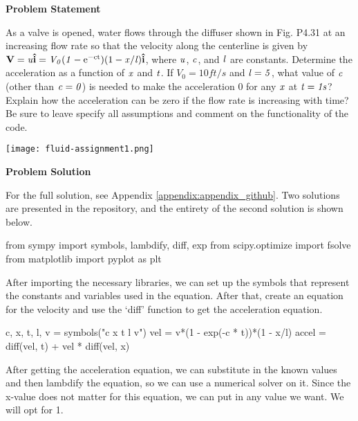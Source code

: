 \begin{tcolorbox}[breakable, enhanced jigsaw, title=ME 571: Assignment \ref{fluid_assignment_1}, 
    colframe=ksu-purple, colback=ksu-gray]

    \textbf{Problem Statement}
    \parindent15pt

    As a valve is opened, water flows through the diffuser shown in Fig. P4.31 at an increasing 
    flow rate so that the velocity along the centerline is given by 
    $ \mathbf{V} = \it{u}\mathbf{\hat{i}}  = V_0(1 - \rm{e}^{-ct})(1 - \it{x/l})\mathbf{\hat{i}} $, 
    where $\it{u}$, $ \it{c} $, and $ \it{l} $ are constants. Determine the acceleration as 
    a function of $ \it{x} $ and $ \it{t} $. If $ V_0 = 10 ft/s $ and $ \it{l} = 5 $, what value 
    of $ \it{c} $ (other than $ \it{c} = 0 $) is needed to make the acceleration 0 for any 
    $ \it{x} $ at $ \it{t} = 1s $? Explain how the acceleration can be zero if the flow rate 
    is increasing with time? Be sure to leave specify all assumptions and comment on the 
    functionality of the code.

    \begin{center}
        \texttt{[image: fluid-assignment1.png]} 
    \end{center}

    \tcblower
    \textbf{Problem Solution}
    \parindent15pt

    For the full solution, see Appendix \ref{appendix:appendix_github}. Two solutions are 
    presented in the repository, and the entirety of the second solution is shown below.

\begin{python}
from sympy import symbols, lambdify, diff, exp
from scipy.optimize import fsolve
from matplotlib import pyplot as plt
\end{python}

After importing the necessary libraries, we can set up the symbols that represent the 
constants and variables used in the equation. After that, create an equation for the 
velocity and use the `diff' function to get the acceleration equation.

\begin{python}
c, x, t, l, v = symbols("c x t l v")
vel = v*(1 - exp(-c * t))*(1 - x/l)
accel = diff(vel, t) + vel * diff(vel, x)
\end{python}

After getting the acceleration equation, we can substitute in the known values and then 
lambdify the equation, so we can use a numerical solver on it. Since the x-value does 
not matter for this equation, we can put in any value we want. We will opt for 1.


\end{tcolorbox}
